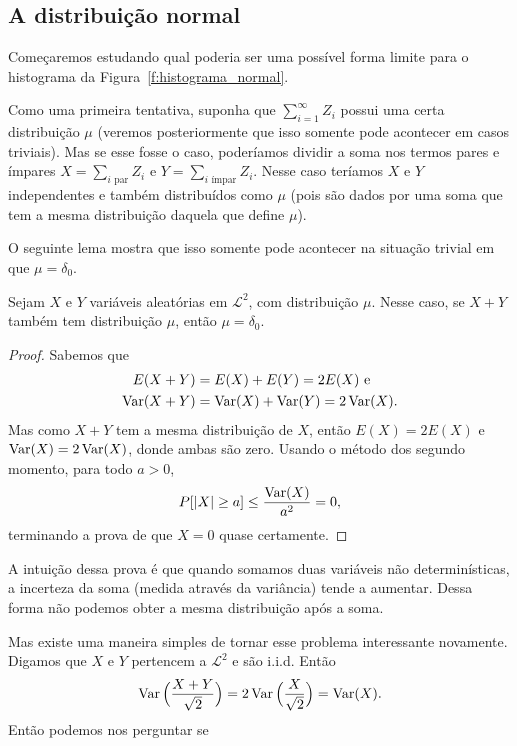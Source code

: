 \subsection{A distribuição normal}

Começaremos estudando qual poderia ser uma possível forma limite para o histograma da Figura~\ref{f:histograma_normal}.

Como uma primeira tentativa, suponha que $\sum_{i=1}^\infty Z_i$ possui uma certa distribuição $\mu$ (veremos posteriormente que isso somente pode acontecer em casos triviais).
Mas se esse fosse o caso, poderíamos dividir a soma nos termos pares e ímpares $X = \sum_{i \text{ par}} Z_i$ e $Y = \sum_{i \text{ ímpar}} Z_i$.
Nesse caso teríamos $X$ e $Y$ independentes e também distribuídos como $\mu$ (pois são dados por uma soma que tem a mesma distribuição daquela que define $\mu$).

O seguinte lema mostra que isso somente pode acontecer na situação trivial em que $\mu = \delta_0$.

\begin{lemma}
  Sejam $X$ e $Y$ variáveis aleatórias em $\mathcal{L}^2$, \iid com distribuição $\mu$.
  Nesse caso, se $X + Y$ também tem distribuição $\mu$, então $\mu = \delta_0$.
\end{lemma}

\begin{proof}
  Sabemos que
  \begin{equation}
    \begin{split}
      E(X + Y) & = E(X) + E(Y) = 2 E(X) \text{ e}\\
      \operatorname{Var}(X + Y) & = \operatorname{Var}(X) + \operatorname{Var}(Y) = 2 \operatorname{Var}(X).
    \end{split}
  \end{equation}
  Mas como $X + Y$ tem a mesma distribuição de $X$, então $E(X) = 2 E(X)$ e $\operatorname{Var}(X) = 2 \operatorname{Var}(X)$, donde ambas são zero.
  Usando o método dos segundo momento, para todo $a > 0$,
  \begin{equation}
    P[|X| \geq a] \leq \frac{\operatorname{Var}(X)}{a^2} = 0,
  \end{equation}
  terminando a prova de que $X = 0$ quase certamente.
\end{proof}

A intuição dessa prova é que quando somamos duas variáveis não determinísticas, a incerteza da soma (medida através da variância) tende a aumentar.
Dessa forma não podemos obter a mesma distribuição após a soma.

Mas existe uma maneira simples de tornar esse problema interessante novamente.
Digamos que $X$ e $Y$ pertencem a $\mathcal{L}^2$ e são i.i.d.
Então
\begin{equation}
  \operatorname{Var}\Big(\frac{X + Y}{\sqrt{2}}\Big) = 2 \operatorname{Var}\Big( \frac X{\sqrt{2}} \Big) = \operatorname{Var}(X).
\end{equation}
Então podemos nos perguntar se

